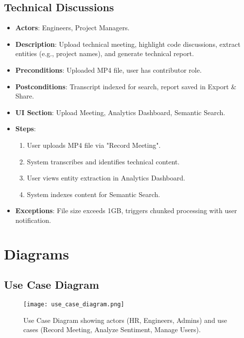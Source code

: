 \documentclass[12pt]{article}
\begin{document}
\subsection{Technical Discussions}
\begin{itemize}
    \item \textbf{Actors}: Engineers, Project Managers.
    \item \textbf{Description}: Upload technical meeting, highlight code discussions, extract entities (e.g., project names), and generate technical report.
    \item \textbf{Preconditions}: Uploaded MP4 file, user has contributor role.
    \item \textbf{Postconditions}: Transcript indexed for search, report saved in Export \& Share.
    \item \textbf{UI Section}: Upload Meeting, Analytics Dashboard, Semantic Search.
    \item \textbf{Steps}:
        \begin{enumerate}
            \item User uploads MP4 file via "Record Meeting".
            \item System transcribes and identifies technical content.
            \item User views entity extraction in Analytics Dashboard.
            \item System indexes content for Semantic Search.
        \end{enumerate}
    \item \textbf{Exceptions}: File size exceeds 1GB, triggers chunked processing with user notification.
\end{itemize}

\section{Diagrams}
\subsection{Use Case Diagram}
\begin{figure}[H]
    \centering
    \texttt{[image: use\_case\_diagram.png]}
    \caption{Use Case Diagram showing actors (HR, Engineers, Admins) and use cases (Record Meeting, Analyze Sentiment, Manage Users).}
\end{figure}
\end{document}
